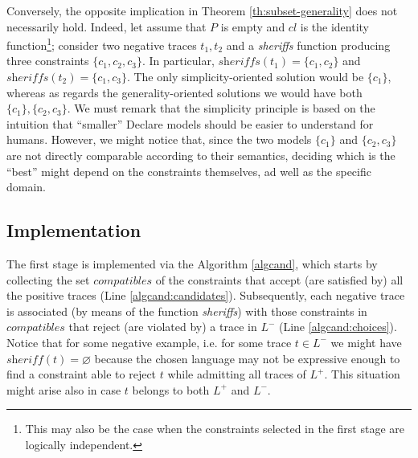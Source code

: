 \documentclass[a4wide,11pt]{article}
\newcommand{\tcolor}[2]{\color{#1}{#2}\color{black}}
\theoremstyle{definition}
\theoremstyle{plain}
\newcommand{\sheriff}{sheriffs}
\begin{document}
Conversely, the opposite implication in Theorem \ref{th:subset-generality} does not necessarily hold. Indeed, let assume that $P$ is empty and $cl$ is the identity function\footnote{This may also be the case when the constraints selected in the first stage are logically independent.}; consider two negative traces $t_1, t_2$ and a \textit{\sheriff} function producing three constraints $\{c_1, c_2,c_3\}$. In particular, $\textit{\sheriff}(t_1)=\{c_1, c_2\}$ and $\textit{\sheriff}(t_2)=\{c_1, c_3\}$. The only simplicity-oriented solution would be  $\{c_1\}$, whereas as regards the generality-oriented solutions we would have both $\{c_1\}, \{c_2, c_3\}$. We must remark that the simplicity principle is based on the intuition that ``smaller'' Declare models should be easier to understand for humans. However, we might notice that, since the two models $\{c_1\}$ and $\{c_2, c_3\}$ are not directly comparable according to their semantics, deciding which is the ``best'' might depend on the constraints themselves, ad well as the specific domain.





\subsection{Implementation}
\label{subsec:impl}

The first stage is implemented via the Algorithm \ref{algcand}, which starts by collecting the set $compatibles$ of the constraints that accept (are satisfied by) all the positive traces (Line \ref{algcand:candidates}). Subsequently, each negative trace is associated (by means of the function \textit{\sheriff}) with those constraints in $compatibles$ that reject (are violated by) a trace in $L^-$ (Line \ref{algcand:choices}). Notice that for some negative example, i.e. for some trace $t\in L^-$ we might have $\textit{sheriff}(t)=\varnothing$ because the chosen language may not be expressive enough to find a constraint able to reject $t$ while admitting all traces of $L^+$. This situation might arise also in case $t$ belongs to both $L^+$ and $L^-$.
%
\end{document}

